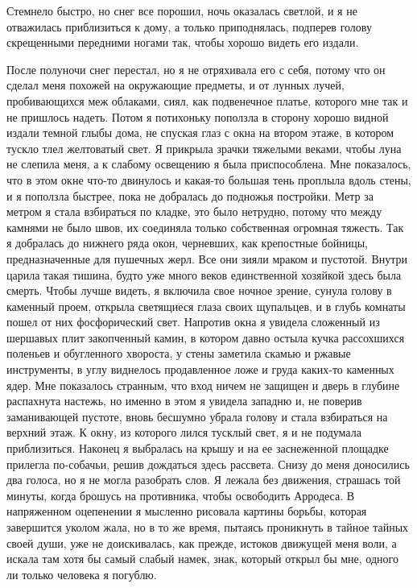 Стемнело  быстро,  но  снег все порошил, ночь оказалась светлой, и я не
отважилась приблизиться к  дому,  а  только  приподнялась,  подперев  голову
скрещенными передними ногами так, чтобы хорошо видеть его издали.

После полуночи снег перестал, но я не отряхивала его с себя, потому что
он сделал   меня   похожей  на  окружающие  предметы,  и  от  лунных  лучей,
пробивающихся меж облаками, сиял, как подвенечное платье, которого мне так и
не пришлось надеть. Потом я потихоньку  поползла  в  сторону  хорошо  видной
издали  темной глыбы дома, не спуская глаз с окна на втором этаже, в котором
тускло тлел желтоватый свет. Я прикрыла зрачки тяжелыми веками,  чтобы  луна
не слепила меня, а к слабому освещению я была приспособлена. Мне показалось,
что  в  этом  окне  что-то  двинулось и какая-то большая тень проплыла вдоль
стены, и я поползла быстрее, пока не добралась до подножья  постройки.  Метр
за  метром я стала взбираться по кладке, это было нетрудно, потому что между
камнями не было швов, их соединяла только собственная огромная тяжесть.  Так
я  добралась  до  нижнего  ряда  окон,  черневших,  как  крепостные бойницы,
предназначенные для пушечных жерл. Все они зияли мраком и  пустотой.  Внутри
царила  такая тишина, будто уже много веков единственной хозяйкой здесь была
смерть. Чтобы лучше видеть, я включила свое ночное зрение, сунула  голову  в
каменный  проем, открыла светящиеся глаза своих щупальцев, и в глубь комнаты
пошел от них фосфорический  свет.  Напротив  окна  я  увидела  сложенный  из
шершавых  плит  закопченный  камин, в котором давно остыла кучка рассохшихся
поленьев  и  обугленного  хвороста,  у  стены  заметила  скамью   и   ржавые
инструменты,  в  углу  виднелось продавленное ложе и груда каких-то каменных
ядер. Мне показалось странным, что вход ничем не защищен и дверь  в  глубине
распахнута  настежь,  но  именно  в  этом  я  увидела  западню и, не поверив
заманивающей пустоте, вновь бесшумно убрала голову  и  стала  взбираться  на
верхний  этаж.  К  окну,  из  которого  лился  тусклый свет, я и не подумала
приблизиться. Наконец я выбралась на крышу  и  на  ее  заснеженной  площадке
прилегла   по-собачьи,   решив  дождаться  здесь  рассвета.  Снизу  до  меня
доносились два голоса, но я не могла разобрать слов. Я лежала без  движения,
страшась той минуты, когда брошусь на противника, чтобы освободить Арродеса.
В  напряженном  оцепенении  я  мысленно  рисовала  картины  борьбы,  которая
завершится уколом жала, но в то же время, пытаясь проникнуть в тайное тайных
своей души, уже не доискивалась, как прежде, истоков движущей меня  воли,  а
искала  там  хотя бы самый слабый намек, знак, который открыл бы мне, одного
ли только человека я погублю.

